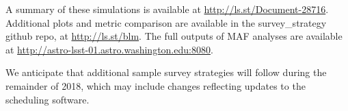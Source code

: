 \documentclass[DM,toc,usenatbib]{lsstdoc}
\begin{document}
A summary of these simulations is available at \url{http://ls.st/Document-28716}. 
Additional plots and metric comparison are available in the survey\_strategy github repo, at \url{http://ls.st/blm}.
The full outputs of MAF analyses are available at \url{http://astro-lsst-01.astro.washington.edu:8080}.  

We anticipate that additional sample survey strategies will follow during the remainder of 2018, which may include changes reflecting updates to the scheduling software.
\end{document}

